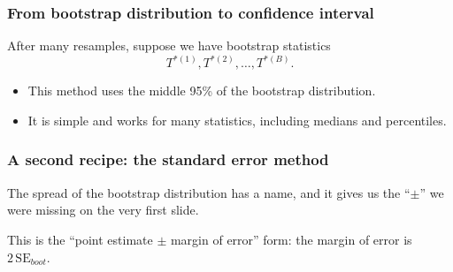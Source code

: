 \documentclass[slidestop,compress,mathserif]{beamer}
\begin{document}
\begin{frame}
\frametitle{From bootstrap distribution to confidence interval}

After many resamples, suppose we have bootstrap statistics
\[
T^{*(1)}, T^{*(2)}, \ldots, T^{*(B)}.
\]
\vspace{0.4em}

\vspace{0.4em}
\begin{itemize}
\item This method uses the middle 95\% of the bootstrap distribution.
\item It is simple and works for many statistics, including medians and percentiles.
\end{itemize}

\end{frame}

\begin{frame}
\frametitle{A second recipe: the standard error method}

The spread of the bootstrap distribution has a name, and it gives us the ``$\pm$'' we were missing on the very first slide.

\vspace{0.3em}

\vspace{0.3em}
This is the ``point estimate $\pm$ margin of error'' form: the margin of error is $2\,\mathrm{SE}_{boot}$.

\end{frame}
\end{document}
